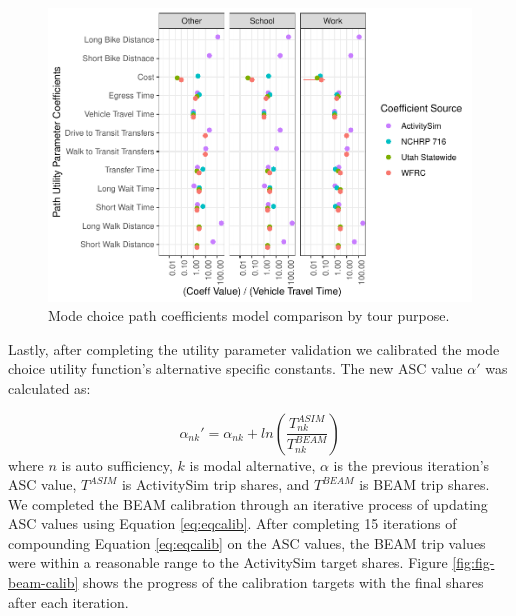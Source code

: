 \documentclass[fancy, masters]{byuthesis}
\begin{document}
\begin{figure}

{\centering \includegraphics{thesis_files/figure-latex/coef-1} 

}

\caption[Path coefficients model comparison.]{Mode choice path coefficients model comparison by tour purpose.}\label{fig:coef}
\end{figure}

Lastly, after completing the utility parameter validation we calibrated the mode choice utility function's alternative specific constants. The new ASC value \(\alpha'\) was calculated as:

\begin{equation}
  \alpha_{nk}' = \alpha_{nk} + ln(\frac{T_{nk}^{ASIM}}{T_{nk}^{BEAM}}) \label{eq:eqcalib}
\end{equation}
where \(n\) is auto sufficiency, \(k\) is modal alternative, \(\alpha\) is the previous iteration's ASC value, \(T^{ASIM}\) is ActivitySim trip shares, and \(T^{BEAM}\) is BEAM trip shares. We completed the BEAM calibration through an iterative process of updating ASC values using Equation \eqref{eq:eqcalib}. After completing 15 iterations of compounding Equation \eqref{eq:eqcalib} on the ASC values, the BEAM trip values were within a reasonable range to the ActivitySim target shares. Figure \ref{fig:fig-beam-calib} shows the progress of the calibration targets with the final shares after each iteration.
\end{document}
